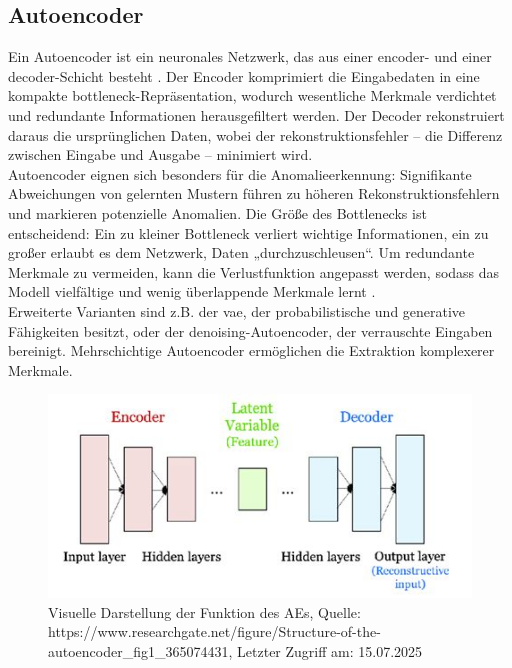 \documentclass[a4paper,12pt]{article}
\begin{document}
	\subsection{Autoencoder}
	Ein Autoencoder ist ein neuronales Netzwerk, das aus einer \gls{encoder}- und einer \gls{decoder}-Schicht besteht \cite[S.3]{michelucci2022introduction}. Der Encoder komprimiert die Eingabedaten in eine kompakte \gls{bottleneck}-Repräsentation, wodurch wesentliche Merkmale verdichtet und redundante Informationen herausgefiltert werden. Der Decoder rekonstruiert daraus die ursprünglichen Daten, wobei der \gls{rekonstruktionsfehler} – die Differenz zwischen Eingabe und Ausgabe – minimiert wird.  
	\\[0.5em]
	Autoencoder eignen sich besonders für die Anomalieerkennung: Signifikante Abweichungen von gelernten Mustern führen zu höheren Rekonstruktionsfehlern und markieren potenzielle Anomalien. Die Größe des Bottlenecks ist entscheidend: Ein zu kleiner Bottleneck verliert wichtige Informationen, ein zu großer erlaubt es dem Netzwerk, Daten „durchzuschleusen“. Um redundante Merkmale zu vermeiden, kann die Verlustfunktion angepasst werden, sodass das Modell vielfältige und wenig überlappende Merkmale lernt \cite{laakom2022reducing}.  
	\\[0.5em]
	Erweiterte Varianten sind z.B. der \gls{vae}, der probabilistische und generative Fähigkeiten besitzt, oder der \gls{denoising}-Autoencoder, der verrauschte Eingaben bereinigt. Mehrschichtige Autoencoder ermöglichen die Extraktion komplexerer Merkmale.
	
	\begin{figure}[H]
		\centering
		\includegraphics[width=0.7\linewidth]{Bilder/screenshot004}
		\caption{Visuelle Darstellung der Funktion des AEs, Quelle: https://www.researchgate.net/figure/Structure-of-the-autoencoder\_fig1\_365074431, Letzter Zugriff am: 15.07.2025}
		\label{fig:screenshot004}
	\end{figure}
	
\end{document}
